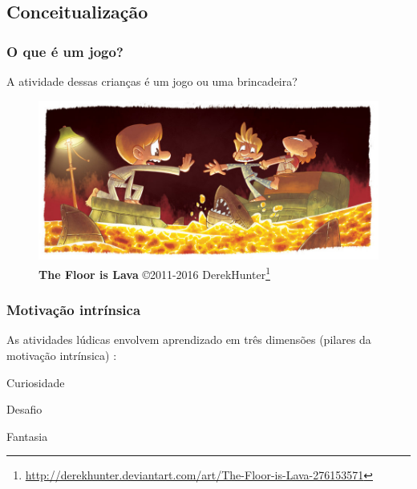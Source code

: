 \expandafter\documentclass\expandafter[table, usenames, svgnames, dvipsnames, \classopts]{beamer}
\begin{document}
\subsection{Conceitualização}

\begin{frame}
	\frametitle{\textbf{O que é um jogo?}}

	\begin{center}
		A atividade dessas crianças é um jogo ou uma brincadeira?
	\end{center}	

	\vspace{-2em}
	
	\begin{figure}
		\centering
		\includegraphics[width=0.9\paperwidth]{floor-is-lava}
		\caption{\textbf{The Floor is Lava} \copyright{2011-2016} DerekHunter\footnote{\url{http://derekhunter.deviantart.com/art/The-Floor-is-Lava-276153571}}}
	\end{figure}
	
	\vspace{2em}

\end{frame}

\begin{frame}
	\frametitle{\textbf{Motivação intrínsica}}

	As atividades lúdicas envolvem aprendizado em três dimensões (pilares da motivação intrínsica) \cite{Malone1980}:

	\vspace{1em}

	\begin{outline}
		\1 Curiosidade
			
		\vspace{1em}
		
		\1 Desafio
					
		\vspace{1em}
		
		\1 Fantasia
	\end{outline}
\end{frame}
\end{document}
